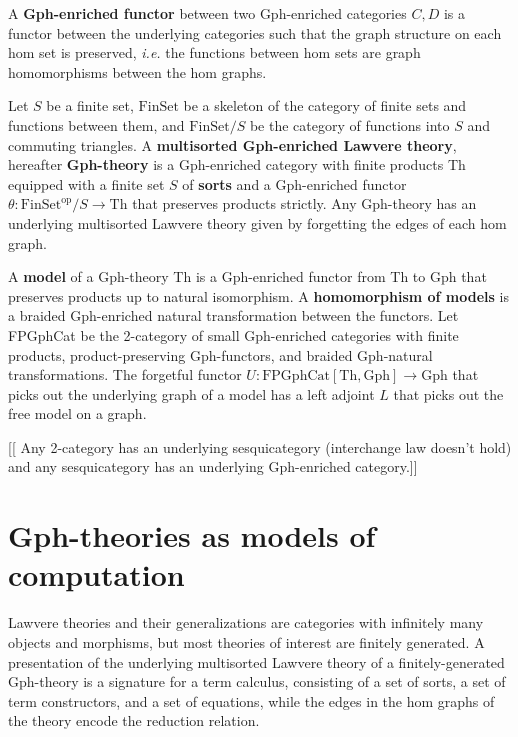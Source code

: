 \documentclass[a4paper,UKenglish]{lipics-v2016}
\newcommand{\maps}{\colon}
\newcommand{\Th}{\mathrm{Th}}
\newcommand{\Gph}{\mathrm{Gph}}
\newcommand{\FinSet}{\mathrm{FinSet}}
\newcommand{\FPGphCat}{\mathrm{FPGphCat}}
\newcommand{\op}{\mathrm{op}}
\begin{document}
A {\bf Gph-enriched functor} between two Gph-enriched categories $C, D$ is a functor between the underlying categories such that the graph structure on each hom set is preserved, {\em i.e.} the functions between hom sets are graph homomorphisms between the hom graphs.

Let $S$ be a finite set, $\FinSet$ be a skeleton of the category of finite sets and functions between them, and $\FinSet/S$ be the category of functions into $S$ and commuting triangles.  A {\bf multisorted Gph-enriched Lawvere theory}, hereafter {\bf Gph-theory} is a Gph-enriched category with finite products Th equipped with a finite set $S$ of {\bf sorts} and a Gph-enriched functor $\theta\maps \FinSet^{\op}/S \to \Th$ that preserves products strictly.  Any Gph-theory has an underlying multisorted Lawvere theory given by forgetting the edges of each hom graph.

A {\bf model} of a Gph-theory Th is a Gph-enriched functor from Th to Gph that preserves products up to natural isomorphism.  A {\bf homomorphism of models} is a braided Gph-enriched natural transformation between the functors.  Let FPGphCat be the 2-category of small Gph-enriched categories with finite products, product-preserving Gph-functors, and braided Gph-natural transformations.  The forgetful functor $U\maps \FPGphCat[\Th, \Gph] \to \Gph$ that picks out the underlying graph of a model has a left adjoint $L$ that picks out the free model on a graph.

[[ Any 2-category has an underlying sesquicategory (interchange law doesn't hold) and any sesquicategory has an underlying Gph-enriched category.]]

\section{Gph-theories as models of computation}

Lawvere theories and their generalizations are categories with infinitely many objects and morphisms, but most theories of interest are finitely generated.  A presentation of the underlying multisorted Lawvere theory of a finitely-generated Gph-theory is a signature for a term calculus, consisting of a set of sorts, a set of term constructors, and a set of equations, while the edges in the hom graphs of the theory encode the reduction relation.
\end{document}

